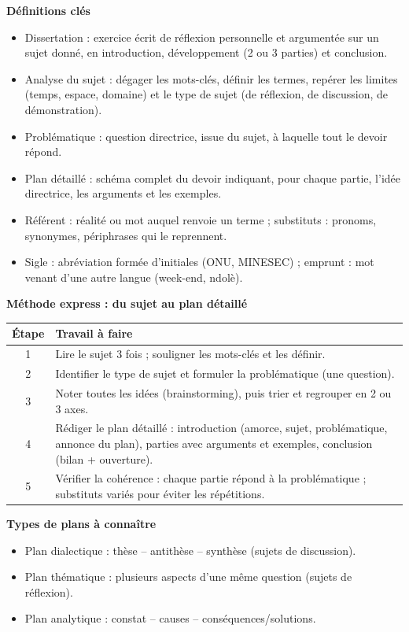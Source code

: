 \documentclass[11pt]{article}
\newcommand{\cle}[1]{{\popxbold\color{popdark}#1}}
\begin{document}
\begin{bilan}
\textbf{Définitions clés}
\begin{itemize}
\item \cle{Dissertation} : exercice écrit de réflexion personnelle et argumentée sur un sujet donné, en introduction, développement (2 ou 3 parties) et conclusion.
\item \cle{Analyse du sujet} : dégager les \cle{mots-clés}, définir les termes, repérer les limites (temps, espace, domaine) et le type de sujet (de réflexion, de discussion, de démonstration).
\item \cle{Problématique} : question directrice, issue du sujet, à laquelle tout le devoir répond.
\item \cle{Plan détaillé} : schéma complet du devoir indiquant, pour chaque partie, l'idée directrice, les arguments et les exemples.
\item \cle{Référent} : réalité ou mot auquel renvoie un terme ; \cle{substituts} : pronoms, synonymes, périphrases qui le reprennent.
\item \cle{Sigle} : abréviation formée d'initiales (ONU, MINESEC) ; \cle{emprunt} : mot venant d'une autre langue (week-end, ndolè).
\end{itemize}

\textbf{Méthode express : du sujet au plan détaillé}
\begin{center}
\begin{tabularx}{\linewidth}{|c|X|}\hline
\rowcolor{popblueL} \textbf{Étape} & \textbf{Travail à faire} \\ \hline
1 & Lire le sujet 3 fois ; souligner les mots-clés et les définir. \\ \hline
2 & Identifier le type de sujet et formuler la problématique (une question). \\ \hline
3 & Noter toutes les idées (brainstorming), puis trier et regrouper en 2 ou 3 axes. \\ \hline
4 & Rédiger le plan détaillé : introduction (amorce, sujet, problématique, annonce du plan), parties avec arguments et exemples, conclusion (bilan + ouverture). \\ \hline
5 & Vérifier la cohérence : chaque partie répond à la problématique ; substituts variés pour éviter les répétitions. \\ \hline
\end{tabularx}
\end{center}

\textbf{Types de plans à connaître}
\begin{itemize}
\item \cle{Plan dialectique} : thèse -- antithèse -- synthèse (sujets de discussion).
\item \cle{Plan thématique} : plusieurs aspects d'une même question (sujets de réflexion).
\item \cle{Plan analytique} : constat -- causes -- conséquences/solutions.
\end{itemize}


\end{bilan}
\end{document}
